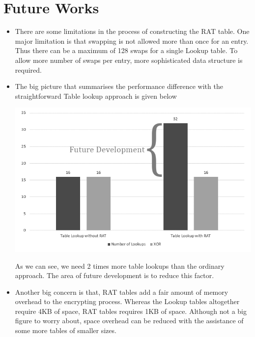 \section{Future Works}

\begin{itemize}

\item There are some limitations in the process of constructing the RAT table. One major limitation is that swapping is not allowed more than once for an entry. Thus there can be a maximum of 128 swaps for a single Lookup table. To allow more number of swaps per entry, more sophisticated data structure is required.

\item The big picture that summarises the performance difference with the straightforward Table lookup approach is given below

\begin{center}
\includegraphics[scale=0.4,natwidth=713,natheight=436]{Figures/performance.png}
\label{fig: Comparison with straightforward Table Lookup approach.}
\end{center}

As we can see, we need 2 times more table lookups than the ordinary approach. The area of future development is to reduce this factor.

\item Another big concern is that, RAT tables add a fair amount of memory overhead to the encrypting process. Whereas the Lookup tables altogether require 4KB of space, RAT tables requires 1KB of space. Although not a big figure to worry about, space overhead can be reduced with the assistance of some more tables of smaller sizes.

\end{itemize}
